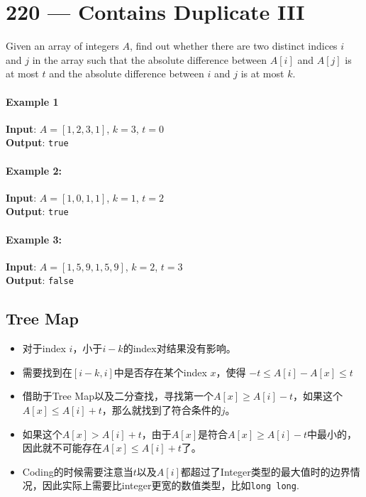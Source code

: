 \section{220 --- Contains Duplicate III}

Given an array of integers $A$, find out whether there are two distinct indices $i$ and $j$ in the array such that the absolute difference between $A[i]$ and $A[j]$ is at most $t$ and the absolute difference between $i$ and $j$ is at most $k$.
\paragraph{Example 1}
\begin{flushleft}
\textbf{Input}: $A = [1,2,3,1]$, $k = 3$, $t = 0$
\\
\textbf{Output}: \texttt{true}
\end{flushleft}
\paragraph{Example 2:}
\begin{flushleft}
\textbf{Input}: $A = [1,0,1,1]$, $k = 1$, $t = 2$
\\
\textbf{Output}: \texttt{true}
\end{flushleft}
\paragraph{Example 3:}
\begin{flushleft}
\textbf{Input}: $A = [1,5,9,1,5,9]$, $k = 2$, $t = 3$
\\
\textbf{Output}: \texttt{false}
\end{flushleft}
\subsection{Tree Map}
\begin{itemize}
\item 对于index $i$，小于$i-k$的index对结果没有影响。
\item 需要找到在$[i-k, i]$中是否存在某个index $x$，使得 $-t\leq A[i] - A[x] \leq t$
\item 借助于Tree Map以及二分查找，寻找第一个$A[x]\geq A[i]-t$，如果这个$A[x]\leq A[i]+t$，那么就找到了符合条件的$j$。
\item 如果这个$A[x] > A[i]+t$，由于$A[x]$是符合$A[x]\geq A[i]-t$中最小的，因此就不可能存在$A[x]\leq A[i]+t$了。
\item Coding的时候需要注意当$t$以及$A[i]$都超过了Integer类型的最大值时的边界情况，因此实际上需要比integer更宽的数值类型，比如\texttt{long long}.
\end{itemize}

